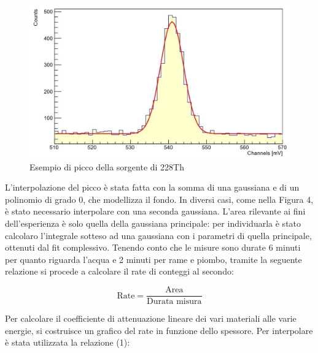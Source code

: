 \documentclass[a4paper,10pt]{article}
\begin{document}
\begin{figure}[!h]
    \centering
    \includegraphics[scale=0.6]{grafici/piccotorio}
    \caption{Esempio di picco della sorgente di 228Th}
\end{figure}

\noindent L'interpolazione del picco \`e stata fatta con la somma di una gaussiana e di un polinomio di grado 0, che modellizza il fondo. In diversi casi, come nella Figura 4, \`e stato necessario interpolare con una seconda gaussiana. L'area rilevante ai fini dell'esperienza \`e solo quella della gaussiana principale: per individuarla \`e stato calcolaro l'integrale sotteso ad una gaussiana con i parametri di quella principale, ottenuti dal fit complessivo. Tenendo conto che le misure sono durate 6 minuti per quanto riguarda l'acqua e 2 minuti per rame e piombo, tramite la seguente relazione si procede a calcolare il rate di conteggi al secondo:

\begin{equation}
	\textrm{Rate} = \frac{\textrm{Area}}{\textrm{Durata  misura}}
\end{equation}

\noindent Per calcolare il coefficiente di attenuazione lineare dei vari materiali alle varie energie, si costruisce un grafico del rate in funzione dello spessore. Per interpolare è stata utilizzata la relazione (1):
\end{document}
